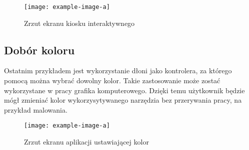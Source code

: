 \begin{figure}[H]
    \begin{center}
        \texttt{[image: example-image-a]}
        \caption{Zrzut ekranu kiosku interaktywnego}
    \end{center}
\end{figure}

\subsection{Dobór koloru}
\quad Ostatnim przykładem jest wykorzystanie dłoni jako kontrolera, za którego pomocą można wybrać dowolny kolor. Takie zastosowanie może zostać wykorzystane w pracy grafika komputerowego. Dzięki temu użytkownik będzie mógł zmieniać kolor wykorzysytywanego narzędzia bez przerywania pracy, na przykład malowania. 

\begin{figure}[H]
    \begin{center}
        \texttt{[image: example-image-a]}
        \caption{Zrzut ekranu aplikacji ustawiającej kolor}
    \end{center}
\end{figure}